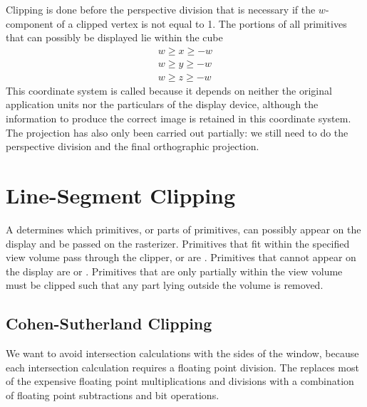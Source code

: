 \documentclass[../COS3712_Notes.tex]{subfiles}
\begin{document}
      Clipping is done before the perspective division that is necessary if the $w$-component
      of a clipped vertex is not equal to 1.
      The portions of all primitives that can possibly be displayed lie within the cube
      \begin{align*}
        w \geq x \geq -w \\
        w \geq y \geq -w \\
        w \geq z \geq -w
      \end{align*}
      This coordinate system is called 
      because it depends on neither the original application units nor the particulars
      of the display device,
      although the information to produce the correct image is retained in this coordinate system.
      The projection has also only been carried out partially: we still need to do the
      perspective division and the final orthographic projection.

    \section{Line-Segment Clipping}
      A  determines which primitives, or parts of primitives,
      can possibly appear on the display and be passed on the rasterizer.
      Primitives that fit within the specified view volume pass through the clipper,
      or are .
      Primitives that cannot appear on the display are  or .
      Primitives that are only partially within the view volume must be clipped such that
      any part lying outside the volume is removed.

      \subsection{Cohen-Sutherland Clipping}
        We want to avoid intersection calculations with the sides of the window,
        because each intersection calculation requires a floating point division.
        The  replaces most of the expensive floating
        point multiplications and divisions with a combination of floating point subtractions
        and bit operations.
\end{document}
